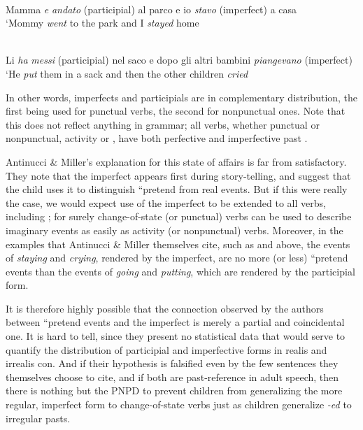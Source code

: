 \ea\label{ex:3:22}
\\
  Mamma \textit{e} \textit{andato} (participial) al parco e io \textit{stavo} (imperfect) a casa\\
\glt `Mommy \textit{went} to the park and I \textit{stayed} home
\z

\ea\label{ex:3:23}
\\
  Li \textit{ha} \textit{messi} (participial) nel saco e dopo gli altri bambini \textit{piangevano} (imperfect)\\ 
\glt `He \textit{put} them in a sack and then the other children \textit{cried}
\z

\noindent In other words, imperfects and participials are in complementary distribution, the first being used for punctual verbs, the second for nonpunctual ones. Note that this does not reflect anything in  grammar; all  verbs, whether punctual or nonpunctual, activity or , have both perfective and imperfective past .

Antinucci \& Miller's explanation for this state of affairs is far from satisfactory. They note that the imperfect appears first during story-telling, and suggest that the child uses it to distinguish ``pretend from real events. But if this were really the case, we would expect use of the imperfect to be extended to all  verbs, including ; for surely change-of-state (or punctual) verbs can be used to describe imaginary events as easily as activity (or nonpunctual) verbs. Moreover, in the examples that Antinucci \& Miller themselves cite, such as  and  above, the events of \textit{staying} and \textit{crying}, rendered by the imperfect, are no more (or less) ``pretend events than the events of \textit{going} and \textit{putting}, which are rendered by the participial form.


It is therefore highly possible that the connection observed by the authors between ``pretend events and the imperfect is merely a partial and coincidental one. It is hard to tell, since they present no statistical data that would serve to quantify the distribution of participial and imperfective forms in realis and irrealis con. And if their hypothesis is falsified even by the few sentences they themselves choose to cite, and if both  are past-reference in adult speech, then there is nothing but the PNPD to prevent children from generalizing the more regular, imperfect form to change-of-state verbs just as  children generalize \textit{-ed} to irregular pasts.

